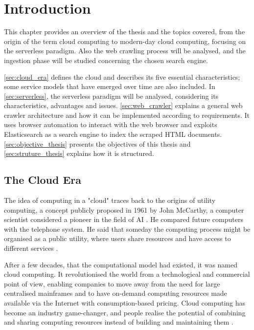 \documentclass[../thesis.tex]{subfiles}
\begin{document}
\chapter{Introduction}\label{cap:introduction}
This chapter provides an overview of the thesis and the topics covered, from the origin of the term cloud computing to modern-day cloud computing, focusing on the serverless paradigm. Also the web crawling process will be analysed, and the ingestion phase will be studied concerning the chosen search engine.

\autoref{sec:cloud_era} defines the cloud and describes its five essential characteristics; some service models that have emerged over time are also included. In \autoref{sec:serverless}, the serverless paradigm will be analysed, considering its characteristics, advantages and issues. \autoref{sec:web_crawler} explains a general web crawler architecture and how it can be implemented according to requirements. It uses browser automation to interact with the web browser and exploits Elasticsearch \cite{site:elasticsearch} as a search engine to index the scraped HTML documents. \autoref{sec:objective_thesis} presents the objectives of this thesis and \autoref{sec:struture_thesis} explains how it is structured.

\section{The Cloud Era}\label{sec:cloud_era}
The idea of computing in a "cloud" traces back to the origins of utility computing, a concept publicly proposed in 1961 by John McCarthy, a computer scientist considered a pioneer in the field of \acrshort{AI} \cite{article:father_ai_2002}. He compared future computers with the telephone system. He said that someday the computing process might be organised as a public utility, where users share resources and have access to different services \cite{book:history_cloud_computing_2013}.

After a few decades, that the computational model had existed, it was named cloud computing. It revolutionised the world from a technological and commercial point of view, enabling companies to move away from the need for large centralised mainframes and to have on-demand computing resources made available via the Internet with consumption-based pricing. Cloud computing has become an industry game-changer, and people realise the potential of combining and sharing computing resources instead of building and maintaining them \cite{book:history_cloud_computing_2013}.
\end{document}

